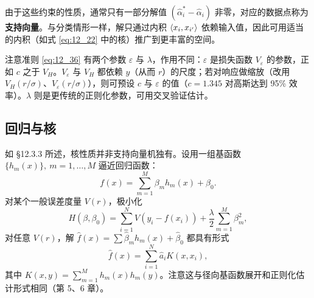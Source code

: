 \begin{remark}[支持向量与内积]
由于这些约束的性质，通常只有一部分解值 $(\hat\alpha_i^*-\hat\alpha_i)$ 非零，对应的数据点称为\textbf{支持向量}。与分类情形一样，解只通过内积 $\langle x_i,x_{i'}\rangle$ 依赖输入值，因此可用适当的内积（如式 \ref{eq:12_22} 中的核）推广到更丰富的空间。

注意准则 \ref{eq:12_36} 有两个参数 $\varepsilon$ 与 $\lambda$，作用不同：$\varepsilon$ 是损失函数 $V_\varepsilon$ 的参数，正如 $c$ 之于 $V_H$。$V_\varepsilon$ 与 $V_H$ 都依赖 $y$（从而 $r$）的尺度；若对响应做缩放（改用 $V_H(r/\sigma)$、$V_\varepsilon(r/\sigma)$），则可预设 $c$ 与 $\varepsilon$ 的值（$c=1.345$ 对高斯达到 95\% 效率）。$\lambda$ 则是更传统的正则化参数，可用交叉验证估计。
\end{remark}

\subsection{回归与核}

如 §12.3.3 所述，核性质并非支持向量机独有。设用一组基函数 $\{h_m(x)\},\ m=1,\dots,M$ 逼近回归函数：
\begin{equation}
f(x) = \sum_{m=1}^{M}\beta_m h_m(x) + \beta_0. \label{eq:12_42}
\end{equation}
对某个一般误差度量 $V(r)$，极小化
\begin{equation}
H(\beta,\beta_0) = \sum_{i=1}^{N}V(y_i - f(x_i)) + \frac{\lambda}{2}\sum_{m=1}^{M}\beta_m^2, \label{eq:12_43}
\end{equation}
对任意 $V(r)$，解 $\hat f(x)=\sum\hat\beta_m h_m(x)+\hat\beta_0$ 都具有形式
\begin{equation}
\hat f(x) = \sum_{i=1}^{N}\hat a_i K(x,x_i), \label{eq:12_44}
\end{equation}
其中 $K(x,y)=\sum_{m=1}^{M}h_m(x)h_m(y)$。注意这与径向基函数展开和正则化估计形式相同（第 5、6 章）。

